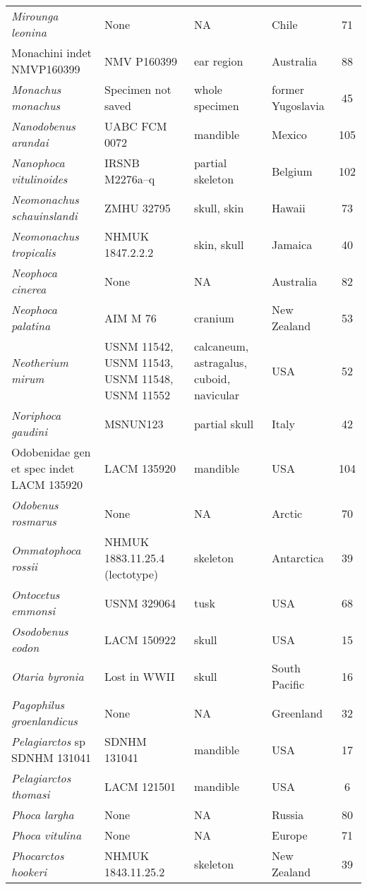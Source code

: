 \begin{longtable}{p{}p{}p{}lc}
\textit{Mirounga leonina} &	None & 	NA & 	Chile & 71\\
Monachini indet NMVP160399	& NMV P160399 & 	ear region & 	Australia & 88\\
\textit{Monachus monachus} &	Specimen not saved & 	whole specimen & 	former Yugoslavia & 45\\
\textit{Nanodobenus arandai} &	UABC FCM 0072 & 	mandible & 	Mexico & 105\\
\textit{Nanophoca vitulinoides} &	IRSNB M2276a–q & 	partial skeleton & 	Belgium & 102\\
\textit{Neomonachus schauinslandi} &	ZMHU 32795 & 	skull, skin & 	Hawaii & 73\\
\textit{Neomonachus tropicalis} &	NHMUK 1847.2.2.2 & 	skin, skull & 	Jamaica & 40\\
\textit{Neophoca cinerea} &	None & 	NA & 	Australia & 82\\
\textit{Neophoca palatina} &	AIM M 76 & 	cranium & 	New Zealand & 53\\
\textit{Neotherium mirum} &	USNM 11542, USNM 11543, USNM 11548, USNM 11552 & calcaneum, astragalus, cuboid, navicular & 	USA & 52\\
\textit{Noriphoca gaudini} & MSNUN123 & 	partial skull & 	Italy & 42\\
Odobenidae gen et spec indet LACM 135920 &	LACM 135920 & 	mandible & 	USA & 104\\
\textit{Odobenus rosmarus} &	None & 	NA & 	Arctic & 70\\
\textit{Ommatophoca rossii} &	NHMUK 1883.11.25.4 (lectotype) & 	skeleton & 	Antarctica & 39\\
\textit{Ontocetus emmonsi} &	USNM 329064 & 	tusk & 	USA & 68\\
\textit{Osodobenus eodon} &	LACM 150922 & 	skull & 	USA & 15\\
\textit{Otaria byronia} &	Lost in WWII & 	skull & 	South Pacific & 16\\
\textit{Pagophilus groenlandicus} &	None & 	NA & 	Greenland & 32\\
\textit{Pelagiarctos} sp SDNHM 131041 &	SDNHM 131041 & 	mandible & 	USA & 17\\
\textit{Pelagiarctos thomasi} &	LACM 121501 & 	mandible & 	USA & 6\\
\textit{Phoca largha} &	None & 	NA & 	Russia	 & 80\\
\textit{Phoca vitulina} &	None & 	NA & 	Europe & 71\\
\textit{Phocarctos hookeri} &	NHMUK 1843.11.25.2 & 	skeleton & 	New Zealand & 39\\

\end{longtable}
